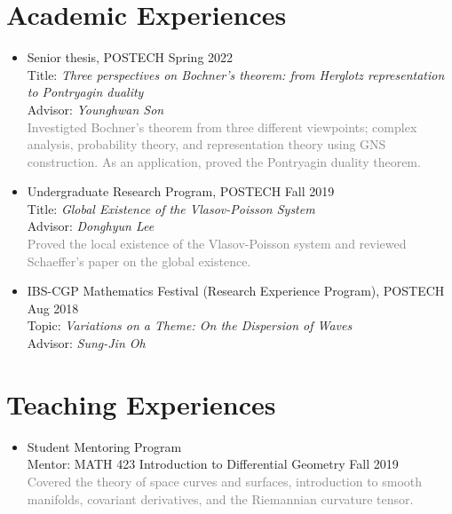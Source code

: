\documentclass[11pt,a4paper]{article}
\begin{document}
\section*{Academic Experiences}
\begin{itemize}
\item
	Senior thesis, POSTECH
	\hfill{\small Spring 2022}\\
	Title: \emph{Three perspectives on Bochner's theorem: from Herglotz representation to Pontryagin duality}\\
	Advisor: \emph{Younghwan Son}\\
	\textcolor{gray}{Investigted Bochner's theorem from three different viewpoints; complex analysis, probability theory, and representation theory using GNS construction. As an application, proved the Pontryagin duality theorem.}

\item
	Undergraduate Research Program, POSTECH
	\hfill{\small Fall 2019}\\
	Title: \emph{Global Existence of the Vlasov-Poisson System}\\
	Advisor: \emph{Donghyun Lee}\\
	\textcolor{gray}{Proved the local existence of the Vlasov-Poisson system and reviewed Schaeffer's paper on the global existence.}
\item IBS-CGP Mathematics Festival (Research Experience Program), POSTECH
	\hfill{\small Aug 2018}\\
	Topic: \emph{Variations on a Theme: On the Dispersion of Waves}\\
	Advisor: \emph{Sung-Jin Oh}
\end{itemize}




\section*{Teaching Experiences}
\begin{itemize}
\item
	Student Mentoring Program\\
	Mentor: MATH 423 Introduction to Differential Geometry
	\hfill{\small Fall 2019}\\
	\textcolor{gray}{Covered the theory of space curves and surfaces, introduction to smooth manifolds, covariant derivatives, and the Riemannian curvature tensor.}
\end{itemize}
\end{document}
